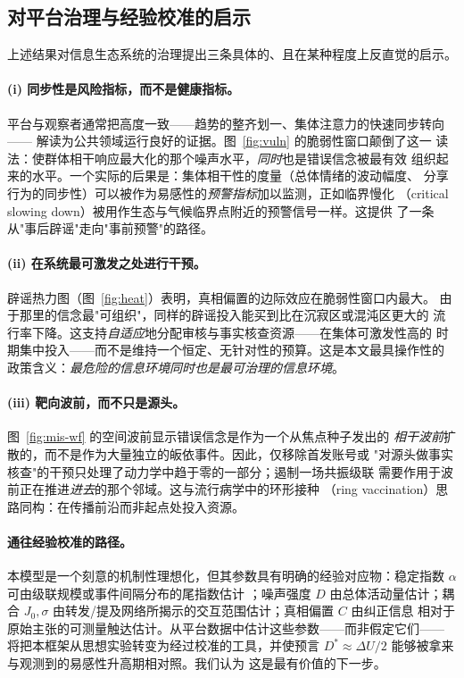 \subsection{对平台治理与经验校准的启示}
\label{sec:governance}
上述结果对信息生态系统的治理提出三条具体的、且在某种程度上反直觉的启示。

\paragraph{(i) 同步性是风险指标，而不是健康指标。}
平台与观察者通常把高度一致——趋势的整齐划一、集体注意力的快速同步转向——
解读为公共领域运行良好的证据。图~\ref{fig:vuln} 的脆弱性窗口颠倒了这一
读法：使群体相干响应最大化的那个噪声水平，\emph{同时}也是错误信念被最有效
组织起来的水平。一个实际的后果是：集体相干性的度量（总体情绪的波动幅度、
分享行为的同步性）可以被作为易感性的\emph{预警指标}加以监测，正如临界慢化
（critical slowing down）被用作生态与气候临界点附近的预警信号一样。这提供
了一条从"事后辟谣"走向"事前预警"的路径。

\paragraph{(ii) 在系统最可激发之处进行干预。}
辟谣热力图（图~\ref{fig:heat}）表明，真相偏置的边际效应在脆弱性窗口内最大。
由于那里的信念最"可组织"，同样的辟谣投入能买到比在沉寂区或混沌区更大的
流行率下降。这支持\emph{自适应}地分配审核与事实核查资源——在集体可激发性高的
时期集中投入——而不是维持一个恒定、无针对性的预算。这是本文最具操作性的
政策含义：\emph{最危险的信息环境同时也是最可治理的信息环境}。

\paragraph{(iii) 靶向波前，而不只是源头。}
图~\ref{fig:mis-wf} 的空间波前显示错误信念是作为一个从焦点种子发出的\emph{
相干波前}扩散的，而不是作为大量独立的皈依事件。因此，仅移除首发账号或
"对源头做事实核查"的干预只处理了动力学中趋于零的一部分；遏制一场共振级联
需要作用于波前正在推进\emph{进去}的那个邻域。这与流行病学中的环形接种
（ring vaccination）思路同构：在传播前沿而非起点处投入资源。

\paragraph{通往经验校准的路径。}
本模型是一个刻意的机制性理想化，但其参数具有明确的经验对应物：稳定指数
$\alpha$ 可由级联规模或事件间隔分布的尾指数估计
\citep{barabasi2005,goel2012}；噪声强度 $D$ 由总体活动量估计；耦合
$J_0,\sigma$ 由转发/提及网络所揭示的交互范围估计；真相偏置 $C$ 由纠正信息
相对于原始主张的可测量触达估计。从平台数据中估计这些参数——而非假定它们——
将把本框架从思想实验转变为经过校准的工具，并使预言
$D^{*}\approx\Delta U/2$ 能够被拿来与观测到的易感性升高期相对照。我们认为
这是最有价值的下一步。

